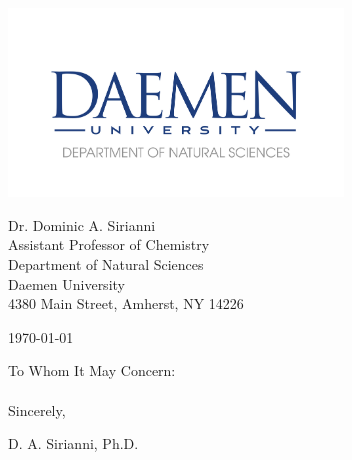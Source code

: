 

\pagestyle{empty}

\begin{center}
\includegraphics[width=3.5in]{includes/natsci_letterhead_logo.png}
\end{center}
\vspace{-0.5cm}
{\noindent Dr. Dominic A. Sirianni\\
Assistant Professor of Chemistry\\
Department of Natural Sciences\\
Daemen University\\
4380 Main Street, Amherst, NY 14226

\hspace*{\fill}\today
}


\noindent To Whom It May Concern:\\

\\

\noindent Sincerely,

\vspace{1.5 cm}

\noindent D. A. Sirianni, Ph.D.



